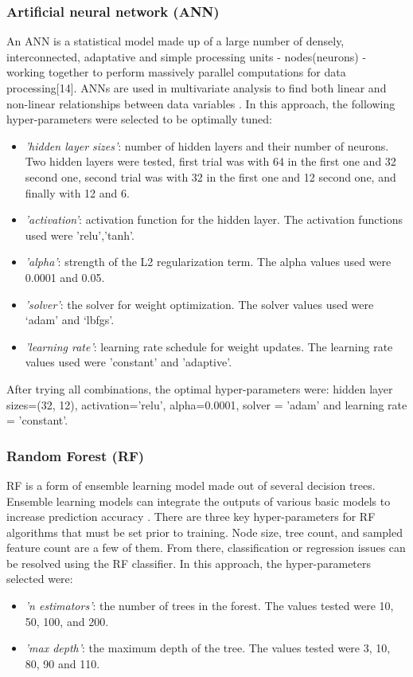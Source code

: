 \documentclass[journal]{IEEEtran} %
\begin{document}
\subsubsection{Artificial neural network (ANN)}
An ANN is a statistical model made up of a large number of densely, interconnected, adaptative and simple processing units - nodes(neurons) - working together to perform massively parallel computations for data processing[14]. ANNs are used in multivariate analysis to find both linear and non-linear relationships between data variables \cite{doi:10.4258/hir.2013.19.2.121}. In this approach, the following hyper-parameters were selected to be optimally tuned:
\begin{itemize}
  \item \textit{'hidden layer sizes'}: number of hidden layers and their number of neurons. Two hidden layers were tested, first trial was with 64 in the first one and 32 second one, second trial was with 32 in the first one and 12 second one, and finally with 12 and 6.
  \item \textit{'activation'}: activation function for the hidden layer. The activation functions used were 'relu','tanh'.
  \item \textit{'alpha'}: strength of the L2 regularization term. The alpha values used were 0.0001 and 0.05.
  \item \textit{'solver'}: the solver for weight optimization. The solver values used were ‘adam’ and ‘lbfgs’.
  \item \textit{'learning rate'}: learning rate schedule for weight updates. The learning rate values used were 'constant' and 'adaptive'.\newline
\end{itemize}

After trying all combinations, the optimal hyper-parameters were: hidden layer sizes=(32, 12),  activation='relu', alpha=0.0001, solver = 'adam' and learning rate = 'constant'.\newline

\subsubsection{Random Forest (RF)}
RF is a form of ensemble learning model made out of several decision trees. Ensemble learning models can integrate the outputs of various basic models to increase prediction accuracy \cite{diagnostics11122242}. There are three key hyper-parameters for RF algorithms that must be set prior to training. Node size, tree count, and sampled feature count are a few of them. From there, classification or regression issues can be resolved using the RF classifier. In this approach, the hyper-parameters selected were:
\begin{itemize}
  \item \textit{'n estimators'}: the number of trees in the forest. The values tested were 10, 50, 100, and 200.
  \item \textit{'max depth'}: the maximum depth of the tree. The values tested were 3, 10, 80, 90 and 110.\newline
\end{itemize}
\end{document}
